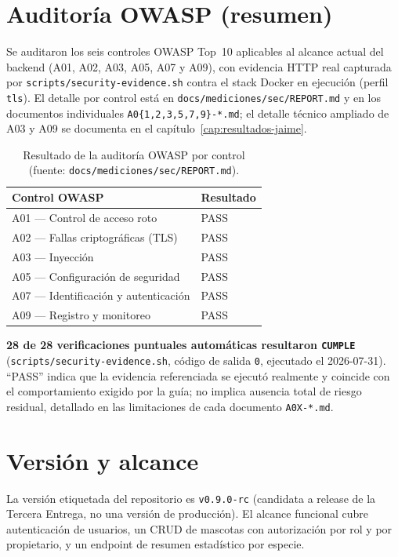 \section{Auditor\'ia OWASP (resumen)}
\label{sec:owasp-resumen}

Se auditaron los seis controles OWASP Top~10 aplicables al alcance actual
del backend (A01, A02, A03, A05, A07 y A09), con evidencia HTTP real
capturada por \texttt{scripts/security-evidence.sh} contra el stack Docker
en ejecuci\'on (perfil \texttt{tls}). El detalle por control est\'a en
\texttt{docs/mediciones/sec/REPORT.md} y en los documentos individuales
\texttt{A0\{1,2,3,5,7,9\}-*.md}; el detalle t\'ecnico ampliado de A03 y A09
se documenta en el cap\'itulo~\ref{cap:resultados-jaime}.

\begin{table}[H]
  \centering
  \caption{Resultado de la auditor\'ia OWASP por control (fuente: \texttt{docs/mediciones/sec/REPORT.md}).}
  \label{tab:owasp-resumen}
  \begin{tabular}{@{}ll@{}}
    \toprule
    Control OWASP & Resultado \\
    \midrule
    A01 --- Control de acceso roto & PASS \\
    A02 --- Fallas criptogr\'aficas (TLS) & PASS \\
    A03 --- Inyecci\'on & PASS \\
    A05 --- Configuraci\'on de seguridad & PASS \\
    A07 --- Identificaci\'on y autenticaci\'on & PASS \\
    A09 --- Registro y monitoreo & PASS \\
    \bottomrule
  \end{tabular}
\end{table}

\textbf{28 de 28 verificaciones puntuales autom\'aticas resultaron
\texttt{CUMPLE}} (\texttt{scripts/security-evidence.sh}, c\'odigo de salida
\texttt{0}, ejecutado el 2026-07-31). ``PASS'' indica que la evidencia
referenciada se ejecut\'o realmente y coincide con el comportamiento exigido
por la gu\'ia; no implica ausencia total de riesgo residual, detallado en
las limitaciones de cada documento \texttt{A0X-*.md}.

\section{Versi\'on y alcance}
La versi\'on etiquetada del repositorio es \texttt{v0.9.0-rc} (candidata a
release de la Tercera Entrega, no una versi\'on de producci\'on). El alcance
funcional cubre autenticaci\'on de usuarios, un CRUD de mascotas con
autorizaci\'on por rol y por propietario, y un endpoint de resumen
estad\'istico por especie.

